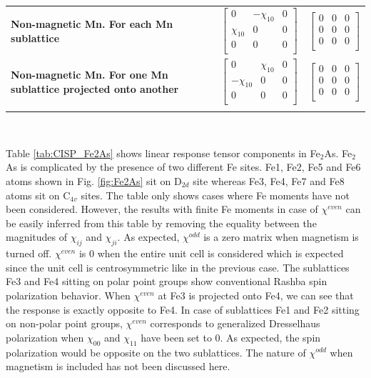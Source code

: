\documentclass[10pt,doublespacing,edeposit]{uiucthesis2020}
\begin{document}
\begin{mainmatter}
\begin{table}
\begin{tabular}{>{\raggedright\arraybackslash}p{7cm}>{\centering\arraybackslash}p{3.5cm}>{\centering\arraybackslash}p{3.5cm}}
\addlinespace[1.5ex]
\hline
\addlinespace[1.5ex]
\textbf{Non-magnetic Mn. For each Mn sublattice} & $\begin{bmatrix} 0 & -\chi_{10} & 0\\ \chi_{10} & 0 & 0\\  0 & 0 & 0\\ \end{bmatrix}$ & $\begin{bmatrix} 0 & 0 & 0\\ 0 & 0 & 0\\ 0 & 0 & 0\\ \end{bmatrix}$\\
\addlinespace[1.5ex]
\hline
\addlinespace[1.5ex]
\textbf{Non-magnetic Mn. For one Mn sublattice projected onto another} & $\begin{bmatrix} 0 & \chi_{10} & 0\\ -\chi_{10} & 0 & 0\\  0 & 0 & 0\\ \end{bmatrix}$ & $\begin{bmatrix} 0 & 0 & 0\\ 0 & 0 & 0\\ 0 & 0 & 0\\ \end{bmatrix}$\\
\addlinespace[1.5ex]
\hline\hline
\end{tabular}
~\\
\end{table}

Table \ref{tab:CISP_Fe2As} shows linear response tensor components in Fe$_2$As. Fe$_2$As is complicated by the presence of two different Fe sites. Fe1, Fe2, Fe5 and Fe6 atoms shown in Fig. \ref{fig:Fe2As} sit on D$_{2d}$ site whereas Fe3, Fe4, Fe7 and Fe8 atoms sit on C$_{4v}$ sites. The table only shows cases where Fe moments have not been considered. However, the results with finite Fe moments in case of $\chi^{even}$ can be easily inferred from this table by removing the equality between the magnitudes of $\chi_{ij}$ and $\chi_{ji}$. As expected, $\chi^{odd}$ is a zero matrix when magnetism is turned off. $\chi^{even}$ is 0 when the entire unit cell is considered which is expected since the unit cell is centrosymmetric like in the previous case. The sublattices Fe3 and Fe4 sitting on polar point groups show conventional Rashba spin polarization behavior. When $\chi^{even}$ at Fe3 is projected onto Fe4, we can see that the response is exactly opposite to Fe4. In case of sublattices Fe1 and Fe2 sitting on non-polar point groups, $\chi^{even}$ corresponds to generalized Dresselhaus polarization when $\chi_{00}$ and $\chi_{11}$ have been set to 0. As expected, the spin polarization would be opposite on the two sublattices. The nature of $\chi^{odd}$ when magnetism is included has not been discussed here.




\end{mainmatter}
\end{document}
